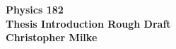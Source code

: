 \documentclass{article}
\begin{document}
    \begin{center}
        \bf{Physics 182 \\ Thesis Introduction Rough Draft \\ Christopher Milke}
    \end{center}

    \vspace{10mm}
\end{document}
